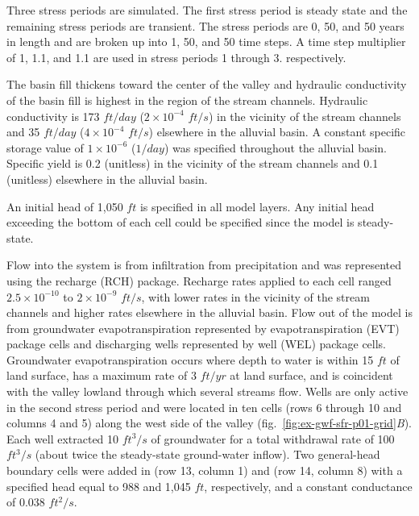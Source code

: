 Three stress periods are simulated. The first stress period is steady state and the remaining stress periods are transient. The stress periods are 0, 50, and 50 years in length and are broken up into 1, 50, and 50 time steps. A time step multiplier of 1, 1.1, and 1.1 are used in stress periods 1 through 3. respectively.



The basin fill thickens toward the center of the valley and hydraulic conductivity of the basin fill is highest in the region of the stream channels. Hydraulic conductivity is 173 $ft/day$ ($2 \times 10^{-4}$ $ft/s$) in the vicinity of the stream channels and 35 $ft/day$ ($4 \times 10^{-4}$ $ft/s$) elsewhere in the alluvial basin. A constant specific storage value of $1 \times 10^{-6}$ ($1/day$) was specified throughout the alluvial basin. Specific yield is 0.2 (unitless) in the vicinity of the stream channels and 0.1 (unitless) elsewhere in the alluvial basin.

An initial head of 1,050 $ft$ is specified in all model layers. Any initial head exceeding the bottom of each cell could be specified since the model is steady-state.

Flow into the system is from infiltration from precipitation and was represented using the recharge (RCH) package. Recharge rates applied to each cell ranged $2.5 \times 10^{-10}$ to $2 \times 10^{-9}$ $ft/s$, with lower rates in the vicinity of the stream channels and higher rates elsewhere in the alluvial basin. Flow out of the model is from groundwater evapotranspiration represented by evapotranspiration (EVT) package cells and discharging wells represented by well (WEL) package cells. Groundwater evapotranspiration occurs where depth to water is within 15 $ft$ of land surface, has a maximum rate of 3 $ft/yr$ at land surface, and is coincident with the valley lowland through which several streams flow. Wells are only active in the second stress period and were located in ten cells (rows 6 through 10 and columns 4 and 5) along the west side of the valley (fig.~\ref{fig:ex-gwf-sfr-p01-grid}\textit{B}). Each well extracted 10 $ft^{3}/s$ of groundwater for a total withdrawal rate of 100 $ft^{3}/s$ (about twice the steady-state ground-water inflow). Two general-head boundary cells were added in (row 13, column 1) and (row 14, column 8) with a specified head equal to 988 and 1,045 $ft$, respectively, and a constant conductance of 0.038 $ft^{2}/s$.

